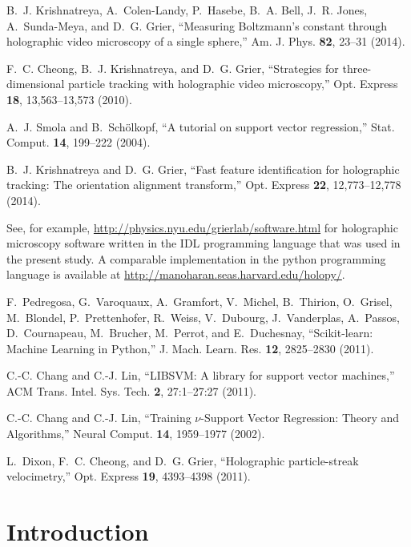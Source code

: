 \documentclass[10pt,letterpaper]{article}
\begin{document}
\begin{thebibliography}{10}
B.~J. Krishnatreya, A.~Colen-Landy, P.~Hasebe, B.~A. Bell, J.~R. Jones,
  A.~Sunda-Meya, and D.~G. Grier, \enquote{Measuring Boltzmann's constant
  through holographic video microscopy of a single sphere,} Am. J. Phys.
  \textbf{82}, 23--31 (2014).

F.~C. Cheong, B.~J. Krishnatreya, and D.~G. Grier, \enquote{Strategies for
  three-dimensional particle tracking with holographic video microscopy,} Opt.
  Express \textbf{18}, 13,563--13,573 (2010).

A.~J. Smola and B.~Sch\"olkopf, \enquote{A tutorial on support vector
  regression,} Stat. Comput. \textbf{14}, 199--222 (2004).

B.~J. Krishnatreya and D.~G. Grier, \enquote{Fast feature identification for
  holographic tracking: The orientation alignment transform,} Opt. Express
  \textbf{22}, 12,773--12,778 (2014).

See, for example, \url{http://physics.nyu.edu/grierlab/software.html} for
  holographic microscopy software written in the IDL programming language that
  was used in the present study. A comparable implementation in the python
  programming language is available at
  \url{http://manoharan.seas.harvard.edu/holopy/}.

F.~Pedregosa, G.~Varoquaux, A.~Gramfort, V.~Michel, B.~Thirion, O.~Grisel,
  M.~Blondel, P.~Prettenhofer, R.~Weiss, V.~Dubourg, J.~Vanderplas, A.~Passos,
  D.~Cournapeau, M.~Brucher, M.~Perrot, and E.~Duchesnay,
  \enquote{Scikit-learn: Machine Learning in {P}ython,} 
  J. Mach. Learn. Res. \textbf{12}, 2825--2830 (2011).

C.-C. Chang and C.-J. Lin, \enquote{{LIBSVM}: A library for support vector
  machines,} ACM Trans. Intel. Sys. Tech. \textbf{2},
  27:1--27:27 (2011).

C.-C. Chang and C.-J. Lin, \enquote{Training $\nu$-Support Vector Regression:
  Theory and Algorithms,} Neural Comput. \textbf{14}, 1959--1977 (2002).

L.~Dixon, F.~C. Cheong, and D.~G. Grier, \enquote{Holographic particle-streak
  velocimetry,} Opt. Express \textbf{19}, 4393--4398 (2011).

\end{thebibliography}

\section{Introduction}
\end{document}
